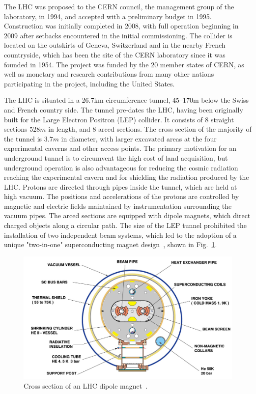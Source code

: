 The LHC was proposed to the CERN council, the management group of the 
laboratory, in 1994, and accepted
with a preliminary budget in 1995. Construction was initially completed in
2008, with full operation beginning in 2009 after setbacks 
encountered in the initial commissioning.
The collider is located on the outskirts
of Geneva, Switzerland and in the nearby French countryside,
which has been the site of the CERN laboratory since it was founded in 1954.
The project was funded by the 20 member states of CERN, as well
as monetary and research contributions from many other nations participating 
in the project, including the United States.

The LHC is situated in a 26.7\unit{km} circumference tunnel, 45--170\unit{m}
below the Swiss and French country side. The tunnel pre-dates the LHC,
having been originally built for the Large Electron Positron (LEP) collider.
It consists of 8 straight sections $528\unit{m}$ in length, and 8 arced sections.
The cross section of the majority of the tunnel is $3.7\unit{m}$ in diameter, with larger excavated
areas at the four experimental caverns and other access points.
The primary motivation for an underground tunnel is to circumvent the high
cost of land acquisition, but underground operation is also advantageous for
reducing the cosmic radiation reaching the experimental cavern and  
for shielding the radiation produced by the LHC. Protons are directed through pipes inside the tunnel, which are held
at high vacuum. The positions and accelerations of the protons are controlled 
by magnetic and electric fields maintained by instrumentation surrounding the 
vacuum pipes. The arced sections are equipped with dipole magnets,
which direct charged objects along a circular path.
The size of the LEP tunnel prohibited the installation of two independent beam
systems, which led to the adoption of a unique "two-in-one" superconducting
magnet design~\cite{temp}, shown in Fig.~\ref{fig:dipoleXsec}. 

\begin{figure}[htbp]
  \centering
   \includegraphics[width=\textwidth]{figures/LHCandCMS/dipoleXSec.jpeg}
  \caption{
    Cross section of an LHC dipole magnet~\cite{Jean-Luc:841539}.
        }
 \label{fig:dipoleXsec}
\end{figure}

